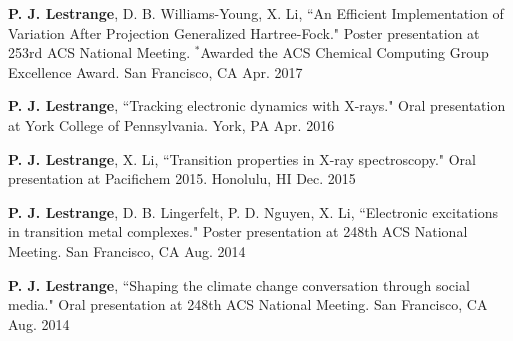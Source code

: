 


\begin{cvpresentations}


\cvpresentation
{\textbf{P. J. Lestrange}, D. B. Williams-Young, X. Li, ``An Efficient Implementation of Variation After Projection Generalized Hartree-Fock." Poster presentation at 253rd ACS National Meeting. $^*$Awarded the ACS Chemical Computing Group Excellence Award.} %
{San Francisco, CA} %
{Apr. 2017} %


\cvpresentation
{\textbf{P. J. Lestrange}, ``Tracking electronic dynamics with X-rays."  Oral presentation at York College of Pennsylvania.} %
{York, PA} %
{Apr. 2016} %


\cvpresentation
{\textbf{P. J. Lestrange}, X. Li, ``Transition properties in X-ray spectroscopy." Oral presentation at Pacifichem 2015.} %
{Honolulu, HI} %
{Dec. 2015} %


\cvpresentation
{\textbf{P. J. Lestrange}, D. B. Lingerfelt, P. D. Nguyen, X. Li, ``Electronic excitations in transition metal complexes." Poster presentation at 248th ACS National Meeting.} %
{San Francisco, CA} %
{Aug. 2014} %


\cvpresentation
{\textbf{P. J. Lestrange}, ``Shaping the climate change conversation through social media." \newline Oral presentation at 248th ACS National Meeting.} %
{San Francisco, CA} %
{Aug. 2014} %



\end{cvpresentations}
